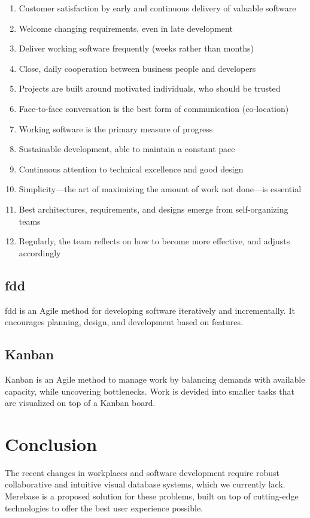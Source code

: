 \begin{enumerate}
	\item Customer satisfaction by early and continuous delivery of valuable software
	\item Welcome changing requirements, even in late development
	\item Deliver working software frequently (weeks rather than months)
	\item Close, daily cooperation between business people and developers
	\item Projects are built around motivated individuals, who should be trusted
	\item Face-to-face conversation is the best form of communication (co-location)
	\item Working software is the primary measure of progress
	\item Sustainable development, able to maintain a constant pace
	\item Continuous attention to technical excellence and good design
	\item Simplicity—the art of maximizing the amount of work not done—is essential
	\item Best architectures, requirements, and designs emerge from self-organizing teams
	\item Regularly, the team reflects on how to become more effective, and adjusts accordingly
\end{enumerate}

\subsection{\acrlong{fdd}}

\acrfull{fdd} is an Agile method for developing software iteratively and incrementally. It encourages planning, design, and development based on features.

\subsection{Kanban}

Kanban is an Agile method to manage work by balancing demands with available capacity, while uncovering bottlenecks. Work is devided into smaller tasks that are visualized on top of a Kanban board.

\section{Conclusion}

The recent changes in workplaces and software development require robust
collaborative and intuitive visual database systems, which we currently
lack. Merebase is a proposed solution for these problems, built on top
of cutting-edge technologies to offer the best user experience possible.